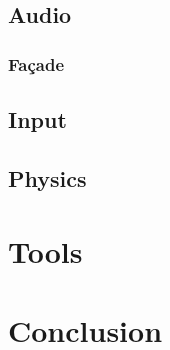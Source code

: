 \documentclass{projdoc}
\begin{document}
\subsection{Audio}

\subsubsection{Fa\c{c}ade}


\subsection{Input}

\subsection{Physics}

\section{Tools}

\section{Conclusion}
\end{document}

